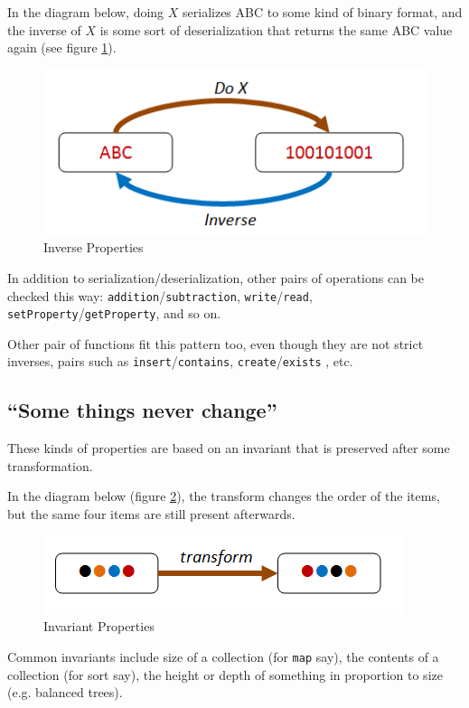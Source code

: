 In the diagram below, doing $X$ serializes ABC to some kind of binary format, and the inverse of $X$ is some sort of deserialization that returns the same ABC value again (see figure \ref{fig:choosing_properties_2}).
\begin{figure}[htbp]
 \centering
 \includegraphics[width=.95\linewidth]{./pics/choosing_properties_2.png}
 \caption{Inverse Properties}
 \label{fig:choosing_properties_2}
\end{figure}
In addition to serialization/deserialization, other pairs of operations can be checked this way: \texttt{addition}/\texttt{subtraction}, \texttt{write}/\texttt{read}, \texttt{setProperty}/\texttt{getProperty}, and so on.

Other pair of functions fit this pattern too, even though they are not strict inverses, pairs such as \texttt{insert}/\texttt{contains}, \texttt{create}/\texttt{exists} , etc.



\subsection{``Some things never change''}
\label{sec:some_things_never_change}

These kinds of properties are based on an invariant that is preserved after some transformation.

In the diagram below (figure \ref{fig:choosing_properties_3}), the transform changes the order of the items, but the same four items are still present afterwards.
\begin{figure}[htbp]
 \centering
 \includegraphics[width=.95\linewidth]{./pics/choosing_properties_3.png}
 \caption{Invariant Properties}
 \label{fig:choosing_properties_3}
\end{figure}
Common invariants include size of a collection (for \texttt{map} say), the contents of a collection (for sort say), the height or depth of something in proportion to size (e.g. balanced trees).

